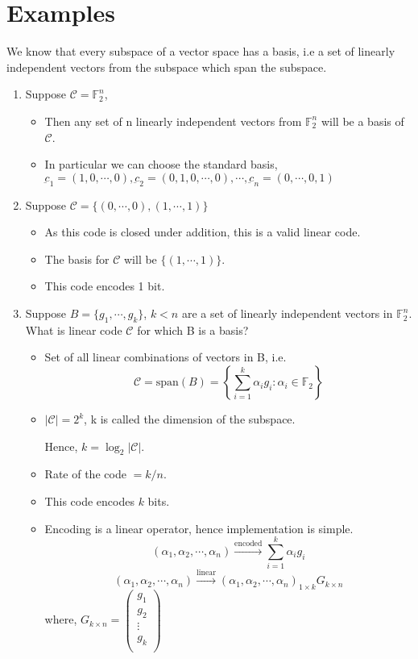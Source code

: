 \documentclass{article}
\begin{document}
\section{Examples}
We know that every subspace of a vector space has a basis, i.e a set of linearly independent vectors from the subspace which span the subspace.
\\
\begin{enumerate}
    \item Suppose $\mathscr{C}= \mathbb{F}_2^n$,
    \begin{itemize}
        \item Then any set of n linearly independent vectors from $\mathbb{F}_2^n$ will be a basis of $\mathscr{C}$.
        \item In particular we can choose the standard basis, $\underbar{c}_1= (1,0,\cdots,0),\underbar{c}_2= (0,1,0,\cdots,0),\cdots, \underbar{c}_n=(0,\cdots,0,1)$
    \end{itemize}
    \item Suppose $\mathscr{C}= \{ (0, \cdots,0), (1,\cdots,1)\}$
    \begin{itemize}
        \item As this code is closed under addition, this is a valid linear code.
        \item The basis for $\mathscr{C}$ will be $\{ (1,\cdots,1)\}$.
        \item This code encodes 1 bit.
    \end{itemize}
    \item Suppose $B= \{ g_1,\cdots, g_k \}$, $k<n$ are a set of linearly independent vectors in $\mathbb{F}_2^n$. What is linear code $\mathscr{C}$ for which B is a basis?
    \begin{itemize}
        \item Set of all linear combinations of vectors in B, i.e. $$ \mathscr{C}= \text{span}(B) = \left\{ \sum_{i=1}^{k} \alpha_i g_i: \alpha_i \in \mathbb{F}_2 \right\}$$
        \item $ |\mathscr{C}|= 2^k$, k is called the dimension of the subspace.

         Hence, $k= \log_2 |\mathscr{C}| $.
         \item Rate of  the code $= k/n $.
         \item This code encodes $k$ bits.
         \item Encoding is a linear operator, hence implementation is simple. $$ ( \alpha_1 , \alpha_2, \cdots, \alpha_n ) \xrightarrow{\text{encoded}} \sum_{i=1}^{k} \alpha_i g_i$$
         $$ ( \alpha_1 , \alpha_2, \cdots, \alpha_n ) \xrightarrow{\text{linear}} ( \alpha_1 , \alpha_2, \cdots, \alpha_n )_{1\times k} G_{k \times n}$$
         where,
         $ G_{k \times n}=
\begin{pmatrix}
  g_1 \\
  g_2 \\
  \vdots \\
  g_k \\
\end{pmatrix}$
    \end{itemize}

\end{enumerate}
\end{document}
